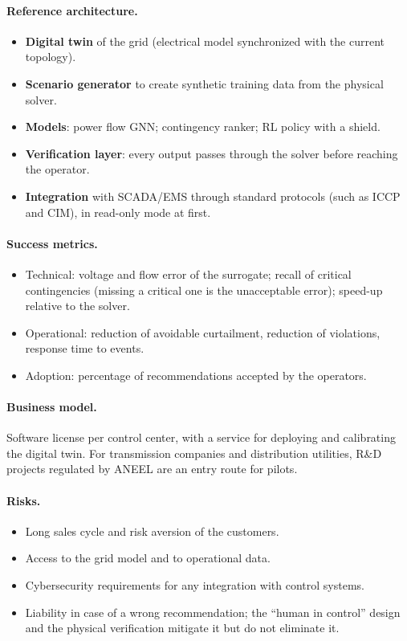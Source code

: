 \documentclass[10pt,a4paper,oneside]{article}
\begin{document}
\paragraph{Reference architecture.}
\begin{itemize}
  \item \textbf{Digital twin} of the grid (electrical model synchronized
    with the current topology).
  \item \textbf{Scenario generator} to create synthetic training data from
    the physical solver.
  \item \textbf{Models}: power flow GNN; contingency ranker; RL policy with
    a shield.
  \item \textbf{Verification layer}: every output passes through the solver
    before reaching the operator.
  \item \textbf{Integration} with SCADA/EMS through standard protocols (such
    as ICCP and CIM), in read-only mode at first.
\end{itemize}

\paragraph{Success metrics.}
\begin{itemize}
  \item Technical: voltage and flow error of the surrogate; recall of
    critical contingencies (missing a critical one is the unacceptable
    error); speed-up relative to the solver.
  \item Operational: reduction of avoidable curtailment, reduction of
    violations, response time to events.
  \item Adoption: percentage of recommendations accepted by the operators.
\end{itemize}

\paragraph{Business model.}
Software license per control center, with a service for deploying and
calibrating the digital twin. For transmission companies and distribution
utilities, R\&D projects regulated by ANEEL are an entry route for pilots.

\paragraph{Risks.}
\begin{itemize}
  \item Long sales cycle and risk aversion of the customers.
  \item Access to the grid model and to operational data.
  \item Cybersecurity requirements for any integration with control systems.
  \item Liability in case of a wrong recommendation; the
    ``human in control'' design and the physical verification mitigate it
    but do not eliminate it.
\end{itemize}
\end{document}
